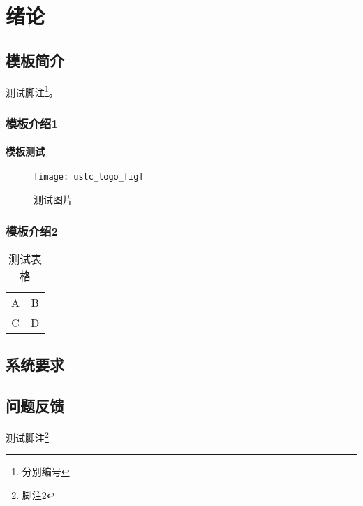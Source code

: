 \chapter{绪论}
\section{模板简介}
测试脚注\footnote{分别编号}。
\subsection{模板介绍1}
\subsubsection{模板测试}
\begin{figure}[ht]
\centering
\texttt{[image: ustc\_logo\_fig]}
\caption{测试图片}
\end{figure}
\subsection{模板介绍2}

\begin{table}[ht]
\centering
\caption{测试表格}
\begin{tabular}{cc}
A   &   B   \\
C   &   D   \\
\end{tabular}
\end{table}
\section{系统要求}
\section{问题反馈}
测试脚注\footnote{脚注2}
